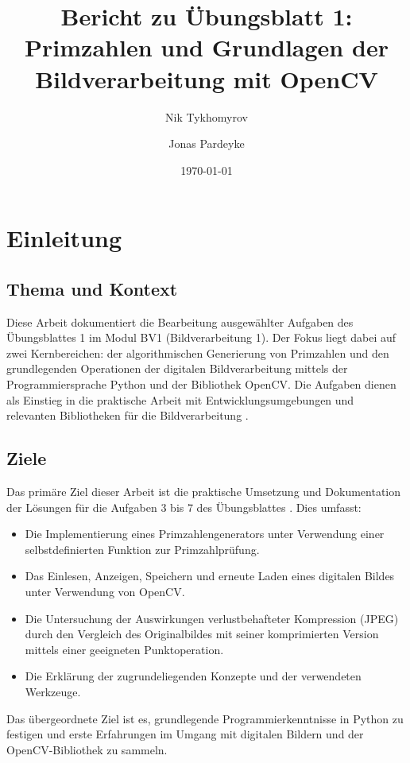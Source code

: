 \documentclass[11pt, a4paper]{article}
\title{Bericht zu Übungsblatt 1: \\ Primzahlen und Grundlagen der Bildverarbeitung mit OpenCV}
\author{Nik Tykhomyrov \and Jonas Pardeyke}
\date{\today} %
\begin{document}
\maketitle

\tableofcontents
\newpage

\section{Einleitung}

\subsection{Thema und Kontext}
Diese Arbeit dokumentiert die Bearbeitung ausgewählter Aufgaben des Übungsblattes 1 im Modul BV1 (Bildverarbeitung 1). Der Fokus liegt dabei auf zwei Kernbereichen: der algorithmischen Generierung von Primzahlen und den grundlegenden Operationen der digitalen Bildverarbeitung mittels der Programmiersprache Python und der Bibliothek OpenCV. Die Aufgaben dienen als Einstieg in die praktische Arbeit mit Entwicklungsumgebungen und relevanten Bibliotheken für die Bildverarbeitung \cite{opencv}.

\subsection{Ziele}
Das primäre Ziel dieser Arbeit ist die praktische Umsetzung und Dokumentation der Lösungen für die Aufgaben 3 bis 7 des Übungsblattes \cite{uebungsblatt}. Dies umfasst:
\begin{itemize}
    \item Die Implementierung eines Primzahlengenerators unter Verwendung einer selbstdefinierten Funktion zur Primzahlprüfung.
    \item Das Einlesen, Anzeigen, Speichern und erneute Laden eines digitalen Bildes unter Verwendung von OpenCV.
    \item Die Untersuchung der Auswirkungen verlustbehafteter Kompression (JPEG) durch den Vergleich des Originalbildes mit seiner komprimierten Version mittels einer geeigneten Punktoperation.
    \item Die Erklärung der zugrundeliegenden Konzepte und der verwendeten Werkzeuge.
\end{itemize}
Das übergeordnete Ziel ist es, grundlegende Programmierkenntnisse in Python zu festigen und erste Erfahrungen im Umgang mit digitalen Bildern und der OpenCV-Bibliothek zu sammeln.
\end{document}
